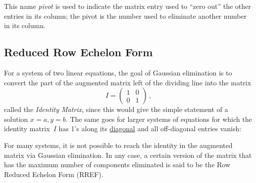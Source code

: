 This name {\itshape pivot}  is  used to indicate the matrix
entry used to ``zero out''  the other entries in its column; the pivot is the number used to eliminate another number in its column.


\subsection{Reduced Row Echelon Form}\label{RREF}
For a system of two linear  equations, the goal of Gaussian elimination is to convert the part of the augmented matrix left of the dividing line into the matrix
 \[I=    \begin{pmatrix}
      1             &0  \\
      0             &1
    \end{pmatrix}\, ,\] 
called the \emph{Identity Matrix}, since this would give the simple statement of a solution $x=a,y=b$. The same goes for  larger systems of equations
for which the identity matrix~$I$ has 1's along its \hyperlink{diagonal}{diagonal} and all off-diagonal entries vanish:
\begin{center}
\end{center}



\vspace{1mm}
\noindent
For many systems, it is not possible to reach the identity in the augmented matrix via Gaussian elimination. In any case, a certain version of the matrix that has the maximum number of components eliminated is said to be the Row Reduced Echelon Form (RREF). 

